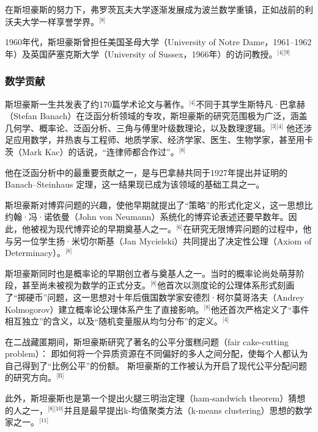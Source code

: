 在斯坦豪斯的努力下，弗罗茨瓦夫大学逐渐发展成为波兰数学重镇，正如战前的利沃夫大学一样享誉学界。\(^\text{[8]}\)

1960年代，斯坦豪斯曾担任美国圣母大学（University of Notre Dame，1961–1962年）及英国萨塞克斯大学（University of Sussex，1966年）的访问教授。\(^\text{[4][9]}\)
\subsubsection{数学贡献}
斯坦豪斯一生共发表了约170篇学术论文与著作。\(^\text{[4]}\)不同于其学生斯特凡·巴拿赫（Stefan Banach）在泛函分析领域的专攻，斯坦豪斯的研究范围极为广泛，涵盖几何学、概率论、泛函分析、三角与傅里叶级数理论，以及数理逻辑。\(^\text{[3][4]}\)  他还涉足应用数学，并热衷与工程师、地质学家、经济学家、医生、生物学家，甚至用卡茨（Mark Kac）的话说，“连律师都合作过”。\(^\text{[8]}\)

他在泛函分析中的最重要贡献之一，是与巴拿赫共同于1927年提出并证明的Banach–Steinhaus 定理，这一结果现已成为该领域的基础工具之一。

斯坦豪斯对博弈问题的兴趣，使他早期就提出了“策略”的形式化定义，这一思想比约翰·冯·诺依曼（John von Neumann）系统化的博弈论表述还要早数年。因此，他被视为现代博弈论的早期奠基人之一。\(^\text{[6]}\)在研究无限博弈问题的过程中，他与另一位学生扬·米切尔斯基（Jan Mycielski）共同提出了决定性公理（Axiom of Determinacy）。\(^\text{[8]}\)

斯坦豪斯同时也是概率论的早期创立者与奠基人之一。当时的概率论尚处萌芽阶段，甚至尚未被视为数学的正式分支。\(^\text{[8]}\)他首次以测度论的公理体系形式刻画了“掷硬币”问题，这一思想对十年后俄国数学家安德烈·柯尔莫哥洛夫（Andrey Kolmogorov）建立概率论公理体系产生了直接影响。\(^\text{[8]}\)他还首次严格定义了“事件相互独立”的含义，以及“随机变量服从均匀分布”的定义。\(^\text{[4]}\)

在二战藏匿期间，斯坦豪斯研究了著名的公平分蛋糕问题（fair cake-cutting problem）：  即如何将一个异质资源在不同偏好的多人之间分配，使每个人都认为自己得到了“比例公平”的份额。  斯坦豪斯的工作被认为开启了现代公平分配问题的研究方向。\(^\text{[B]}\)

此外，斯坦豪斯也是第一个提出火腿三明治定理（ham-sandwich theorem）猜想的人之一，\(^\text{[8][10]}\)并且是最早提出k-均值聚类方法（k-means clustering）思想的数学家之一。\(^\text{[11]}\)

